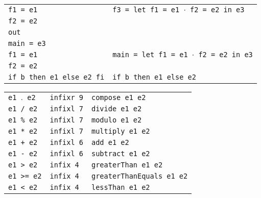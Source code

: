 \begin{table}[H]
\begin{center}
\begin{tabularx}{\textwidth}{|P{15em}|X|}
            \texttt{f1 = e1}                 & \texttt{f3 = let f1 = e1 $\cdot$ f2 = e2 in e3}                  \\
            \texttt{f2 = e2}                 &                                                                  \\
            \texttt{out}                     &                                                                  \\
            \hline
            \texttt{main = e3}               &                                                                  \\
            \texttt{f1 = e1}                 & \texttt{main = let f1 = e1 $\cdot$ f2 = e2 in e3}                \\
            \texttt{f2 = e2}                 &                                                                  \\
            \hline
            \texttt{if b then e1 else e2 fi} & \texttt{if b then e1 else e2}                                    \\
            \hline
        \end{tabularx}
        \begin{tabularx}{\textwidth}{|P{7em}@{\quad}P{7em}|X|}
            \texttt{e1 $\mathord{.}$ e2} & \texttt{infixr 9} & \texttt{compose e1 e2}            \\
            \texttt{e1 / e2}             & \texttt{infixl 7} & \texttt{divide e1 e2}             \\
            \texttt{e1 \% e2}            & \texttt{infixl 7} & \texttt{modulo e1 e2}             \\
            \texttt{e1 * e2}             & \texttt{infixl 7} & \texttt{multiply e1 e2}           \\
            \texttt{e1 + e2}             & \texttt{infixl 6} & \texttt{add e1 e2}                \\
            \texttt{e1 - e2}             & \texttt{infixl 6} & \texttt{subtract e1 e2}           \\
            \texttt{e1 > e2}             & \texttt{infix 4}  & \texttt{greaterThan e1 e2}        \\
            \texttt{e1 >= e2}            & \texttt{infix 4}  & \texttt{greaterThanEquals e1 e2}  \\
            \texttt{e1 < e2}             & \texttt{infix 4}  & \texttt{lessThan e1 e2}           \\

\end{tabularx}
\end{center}
\end{table}
